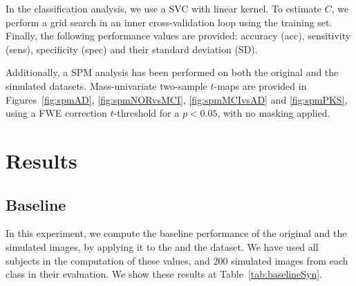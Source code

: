 In the classification analysis, we use a \ac{SVC} with linear kernel. To estimate $C$, we perform a grid search in an inner cross-validation loop using the training set. Finally, the following performance values are provided: accuracy (acc), sensitivity (sens), specificity (spec) and their standard deviation (SD). 

Additionally, a \ac{SPM} analysis \cite{spm_book} has been performed on both the original and the simulated datasets. Mass-univariate two-sample $t$-maps are provided in Figures~\ref{fig:spmAD}, \ref{fig:spmNORvsMCI}, \ref{fig:spmMCIvsAD} and \ref{fig:spmPKS}, using a \ac{FWE} correction $t$-threshold for a $p<0.05$, with no masking applied. 

\section{Results}
\label{sec:resultsSynthesis}
\subsection{Baseline}
In this experiment, we compute the baseline performance of the original and the simulated images, by applying it to the \adnipet{} and the \ppmidat{} dataset. We have used all subjects in the computation of these values, and 200 simulated images from each class in their evaluation. We show these results at Table~\ref{tab:baselineSyn}. 


